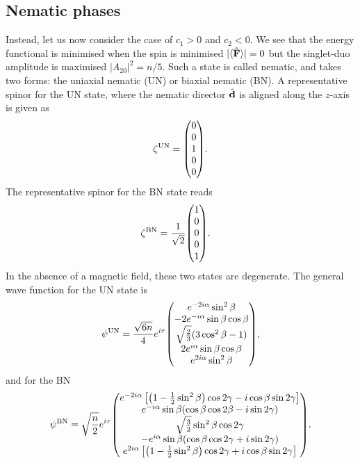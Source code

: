 \subsection{Nematic phases}
Instead, let us now consider the case of \(c_1 > 0\) and \(c_2 < 0\).
We see that the energy functional is minimised when the spin is minimised
\(|\langle \hat{\vb{F}} \rangle | = 0\) but the singlet-duo amplitude is maximised
\(|A_{20}|^2 = n/5\).
Such a state is called nematic, and takes two forms: the uniaxial nematic (UN)
or biaxial nematic (BN).
A representative spinor for the UN state, where the nematic director
\(\hat{\vb{d}}\) is aligned along the \(z\)-axis is given as
\begin{align}\label{eq: UN-spinor}
    \zeta^\mathrm{UN} = \mqty(0 \\ 0 \\ 1 \\ 0 \\ 0).
\end{align}
The representative spinor for the BN state reads
\begin{align}\label{eq: BN-spinor}
    \zeta^\mathrm{BN} &= \frac{1}{\sqrt{2}}\mqty(1 \\ 0 \\0 \\ 0 \\ 1).
\end{align}
In the absence of a magnetic field, these two states are degenerate.
The general wave function for the UN state is
\begin{equation}\label{eq: UN-representative-spinor}
    \psi^\mathrm{UN} = \frac{\sqrt{6n}}{4}e^{i\tau}\mqty(
    e^{-2i\alpha} \sin^2\beta \\
    -2e^{-i\alpha} \sin\beta \cos\beta \\
    \sqrt{\frac{2}{3}}(3\cos^2\beta - 1) \\
    2e^{i\alpha} \sin\beta \cos\beta \\
    e^{2i\alpha} \sin^2\beta
    ),
\end{equation}
and for the BN
\begin{equation}\label{eq: BN-representative-spinor}
    \psi^\mathrm{BN} = \sqrt{\frac{n}{2}}e^{i\tau} \mqty(
    e^{-2i\alpha}\left[\left(1 - \frac{1}{2}\sin^2\beta\right)\cos 2\gamma
        - i\cos\beta\sin 2\gamma\right] \\
    e^{-i\alpha}\sin\beta(\cos\beta\cos 2\beta - i\sin 2\gamma) \\
    \sqrt{\frac{3}{2}}\sin^2\beta \cos 2\gamma \\
    -e^{i\alpha}\sin\beta(\cos\beta\cos 2\gamma + i\sin 2\gamma) \\
    e^{2i\alpha}\left[\left(1 - \frac{1}{2}\sin^2\beta\right)\cos 2\gamma
        + i\cos\beta\sin 2\gamma\right]
    ).
\end{equation}

